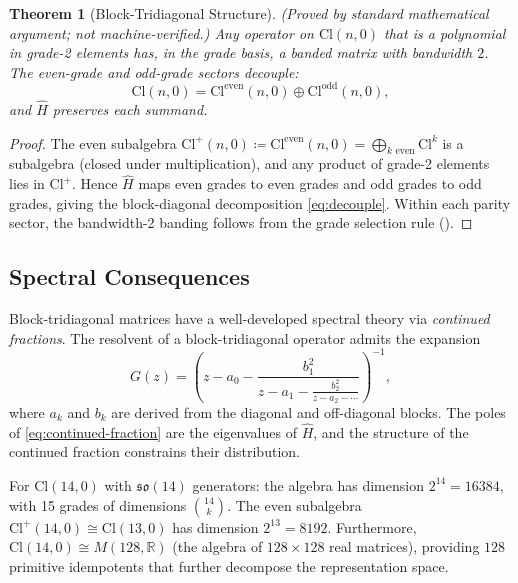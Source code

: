 \documentclass[11pt]{article}
\newtheorem{theorem}{Theorem}[section]
\newcommand{\so}{\mathfrak{so}}
\newcommand{\Cl}{\mathrm{Cl}}
\newcommand{\RR}{\mathbb{R}}
\begin{document}
\begin{theorem}[Block-Tridiagonal Structure]\label{thm:block-tridiag}
\textup{(Proved by standard mathematical argument; not machine-verified.)}
Any operator on $\Cl(n,0)$ that is a polynomial in grade-2 elements
has, in the grade basis, a banded matrix with bandwidth $2$. The
even-grade and odd-grade sectors decouple:
\begin{equation}\label{eq:decouple}
  \Cl(n,0) = \Cl^{\mathrm{even}}(n,0) \oplus \Cl^{\mathrm{odd}}(n,0),
\end{equation}
and $\hat{H}$ preserves each summand.
\end{theorem}

\begin{proof}
The even subalgebra $\Cl^+(n,0) \coloneqq \Cl^{\mathrm{even}}(n,0)
= \bigoplus_{k \text{ even}} \Cl^k$ is a subalgebra (closed under
multiplication), and any product of grade-2 elements lies in
$\Cl^+$. Hence $\hat{H}$ maps even grades
to even grades and odd grades to odd grades, giving the
block-diagonal decomposition \eqref{eq:decouple}. Within each parity
sector, the bandwidth-2 banding follows from the grade selection rule
().
\end{proof}

\subsection{Spectral Consequences}

Block-tridiagonal matrices have a well-developed spectral theory via
\emph{continued fractions}. The resolvent of a block-tridiagonal
operator admits the expansion
\begin{equation}\label{eq:continued-fraction}
  G(z) = \left(z - a_0 - \frac{b_1^2}{z - a_1 -
    \frac{b_2^2}{z - a_2 - \cdots}}\right)^{-1},
\end{equation}
where $a_k$ and $b_k$ are derived from the diagonal and off-diagonal
blocks. The poles of \eqref{eq:continued-fraction} are the eigenvalues
of $\hat{H}$, and the structure of the continued fraction constrains
their distribution.

For $\Cl(14,0)$ with $\so(14)$ generators: the algebra has dimension
$2^{14} = 16384$, with 15 grades of dimensions
$\binom{14}{k}$. The even subalgebra $\Cl^+(14,0) \cong \Cl(13,0)$
has dimension $2^{13} = 8192$. Furthermore, $\Cl(14,0) \cong M(128,
\RR)$ (the algebra of $128 \times 128$ real matrices), providing $128$
primitive idempotents that further decompose the representation space.
\end{document}
